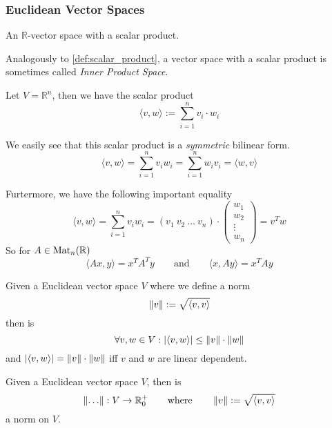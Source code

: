 \subsubsection{Euclidean Vector Spaces}
\begin{definition}
   An \(\mathbb{R}\)-vector space with a scalar product.
\end{definition}
\begin{remark}
   Analogously to \cref{def:scalar_product}, a vector space with a scalar product is sometimes called \emph{Inner Product Space}.
\end{remark}

\begin{definition}\label{def:std_scal_prod}
   Let \(V = \mathbb{R}^n\), then we have the scalar product
   \[\langle v, w \rangle := \sum_{i=1}^n v_i \cdot w_i\]
\end{definition}
\begin{remark}
   We easily see that this scalar product is a \emph{symmetric} bilinear form.
   \[\langle v, w \rangle = \sum_{i=1}^n v_iw_i = \sum_{i=1}^n w_iv_i = \langle w, v\rangle\]
\end{remark}
\begin{remark}
   Furtermore, we have the following important equality
   \[\langle v, w \rangle = \sum_{i=1}^n v_i w_i = (v_1~v_2~\ldots~v_n)\cdot \begin{pmatrix}w_1\\w_2\\\vdots\\w_n\end{pmatrix} = v^T w\]
   So for \(A \in \operatorname{Mat}_n(\mathbb{R})\)
   \[\langle Ax, y\rangle = x^TA^Ty \qquad\text{and}\qquad \langle x, Ay\rangle = x^TAy\]
\end{remark}

\begin{proposition}\label{pro:cauchy_schwarz}
   Given a Euclidean vector space \(V\) where we define a norm
   \[\left\lVert v\right\rVert := \sqrt{\langle v, v\rangle}\]
   then is
   \[\forall v, w \in V: \left\lvert\langle v, w\rangle\right\rvert \leq \left\lVert v\right\rVert \cdot \left\lVert w\right\rVert\]
   and \(\left\lvert\langle v, w\rangle\right\rvert = \left\lVert v\right\rVert \cdot \left\lVert w\right\rVert\) iff \(v\) and \(w\) are linear dependent.
\end{proposition}

\begin{corollary}\label{cor:euclid_norm}
   Given a Euclidean vector space \(V\), then is
   \[\left\lVert\ldots\right\rVert: V \to \mathbb{R}_0^+ \qquad\text{where}\qquad \left\lVert v\right\rVert := \sqrt{\langle v, v\rangle}\]
   a norm on \(V\).
\end{corollary}

